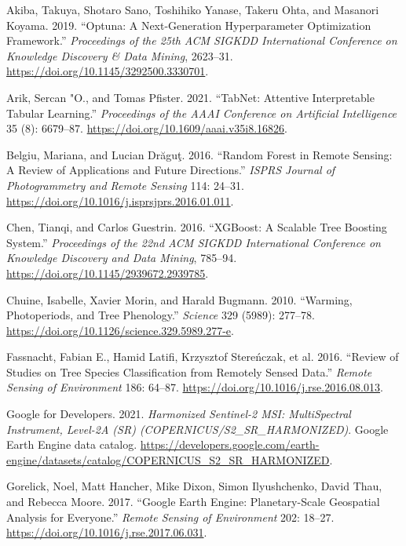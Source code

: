 \documentclass[11pt,a4paper]{scrartcl}
\begin{document}
\clearpage
\protect{}\label{refs}
\begin{CSLReferences}{1}{1}
Akiba, Takuya, Shotaro Sano, Toshihiko Yanase, Takeru Ohta, and Masanori
Koyama. 2019. {``Optuna: A Next-Generation Hyperparameter Optimization
Framework.''} \emph{Proceedings of the 25th ACM SIGKDD International
Conference on Knowledge Discovery \& Data Mining}, 2623--31.
\url{https://doi.org/10.1145/3292500.3330701}.

Arik, Sercan "O., and Tomas Pfister. 2021. {``TabNet: Attentive
Interpretable Tabular Learning.''} \emph{Proceedings of the AAAI
Conference on Artificial Intelligence} 35 (8): 6679--87.
\url{https://doi.org/10.1609/aaai.v35i8.16826}.

Belgiu, Mariana, and Lucian Drăguţ. 2016. {``Random Forest in Remote
Sensing: A Review of Applications and Future Directions.''} \emph{ISPRS
Journal of Photogrammetry and Remote Sensing} 114: 24--31.
\url{https://doi.org/10.1016/j.isprsjprs.2016.01.011}.

Chen, Tianqi, and Carlos Guestrin. 2016. {``XGBoost: A Scalable Tree
Boosting System.''} \emph{Proceedings of the 22nd ACM SIGKDD
International Conference on Knowledge Discovery and Data Mining},
785--94. \url{https://doi.org/10.1145/2939672.2939785}.

Chuine, Isabelle, Xavier Morin, and Harald Bugmann. 2010. {``Warming,
Photoperiods, and Tree Phenology.''} \emph{Science} 329 (5989): 277--78.
\url{https://doi.org/10.1126/science.329.5989.277-e}.

Fassnacht, Fabian E., Hamid Latifi, Krzysztof Stereńczak, et al. 2016.
{``Review of Studies on Tree Species Classification from Remotely Sensed
Data.''} \emph{Remote Sensing of Environment} 186: 64--87.
\url{https://doi.org/10.1016/j.rse.2016.08.013}.

Google for Developers. 2021. \emph{Harmonized Sentinel-2 MSI:
MultiSpectral Instrument, Level-2A (SR)
(COPERNICUS/S2\_SR\_HARMONIZED)}. Google Earth Engine data catalog.
\url{https://developers.google.com/earth-engine/datasets/catalog/COPERNICUS_S2_SR_HARMONIZED}.

Gorelick, Noel, Matt Hancher, Mike Dixon, Simon Ilyushchenko, David
Thau, and Rebecca Moore. 2017. {``Google Earth Engine: Planetary-Scale
Geospatial Analysis for Everyone.''} \emph{Remote Sensing of
Environment} 202: 18--27.
\url{https://doi.org/10.1016/j.rse.2017.06.031}.


\end{CSLReferences}
\end{document}

